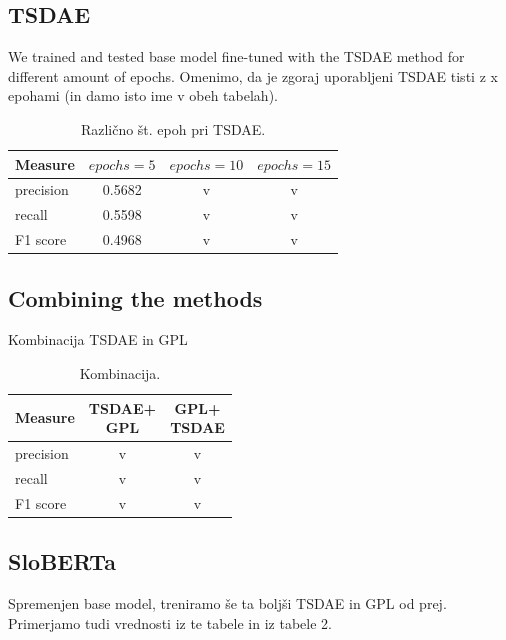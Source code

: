 \documentclass[fleqn,moreauthors,10pt]{ds_report}
\begin{document}
\subsection*{TSDAE}
We trained and tested base model fine-tuned with the TSDAE method for different amount of epochs.
Omenimo, da je zgoraj uporabljeni TSDAE tisti z x epohami (in damo isto ime v obeh tabelah).

\begin{table}[!h]
	\footnotesize
	\begin{center}
		\begin{tabular}{ |l|c|c|c| }
		\hline
		\rowcolor{Red}Measure & $epochs=5$ & $epochs=10$ & $epochs=15$ \\
		\hline

		precision & 0.5682 & v & v\\
		recall & 0.5598 & v & v\\
		F1 score & 0.4968 & v & v\\

		\hline
		\end{tabular}
	\end{center}
\caption{Različno št. epoh pri TSDAE.}
\label{tab3}
\end{table}


\subsection*{Combining the methods}
Kombinacija TSDAE in GPL

\begin{table}[!h]
	\footnotesize
	\begin{center}
		\begin{tabular}{ |l|c|c| }
		\hline
		\rowcolor{Red}Measure & \thead{TSDAE+\\GPL} & \thead{GPL+\\TSDAE} \\
		\hline

		precision & v & v\\
		recall & v & v\\
		F1 score & v & v\\

		\hline
		\end{tabular}
	\end{center}
\caption{Kombinacija.}
\label{tab4}
\end{table}


\subsection*{SloBERTa}
Spremenjen base model, treniramo še ta boljši TSDAE in GPL od prej.
Primerjamo tudi vrednosti iz te tabele in iz tabele 2.
\end{document}
